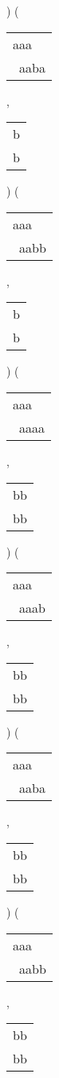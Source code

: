 ) 
 ( 
\begin{tabular}{|l|} \hline
aaa\ \  \\
\ aaba \\
\hline
\end{tabular} 
 , 
\begin{tabular}{|l|} \hline
b \\
b \\
\hline
\end{tabular} 
) 
 ( 
\begin{tabular}{|l|} \hline
aaa\ \  \\
\ aabb \\
\hline
\end{tabular} 
 , 
\begin{tabular}{|l|} \hline
b \\
b \\
\hline
\end{tabular} 
) 
 ( 
\begin{tabular}{|l|} \hline
aaa\ \  \\
\ aaaa \\
\hline
\end{tabular} 
 , 
\begin{tabular}{|l|} \hline
bb \\
bb \\
\hline
\end{tabular} 
) 
 ( 
\begin{tabular}{|l|} \hline
aaa\ \  \\
\ aaab \\
\hline
\end{tabular} 
 , 
\begin{tabular}{|l|} \hline
bb \\
bb \\
\hline
\end{tabular} 
) 
 ( 
\begin{tabular}{|l|} \hline
aaa\ \  \\
\ aaba \\
\hline
\end{tabular} 
 , 
\begin{tabular}{|l|} \hline
bb \\
bb \\
\hline
\end{tabular} 
) 
 ( 
\begin{tabular}{|l|} \hline
aaa\ \  \\
\ aabb \\
\hline
\end{tabular} 
 , 
\begin{tabular}{|l|} \hline
bb \\
bb \\
\hline
\end{tabular} 
